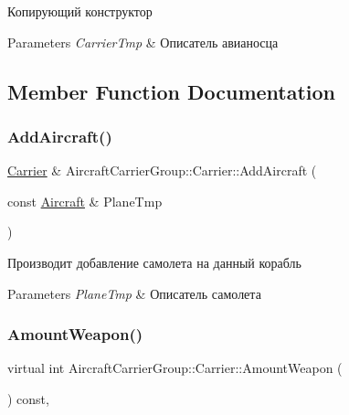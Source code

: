 Копирующий конструктор 


\begin{DoxyParams}{Parameters}
{\em Carrier\+Tmp} & Описатель авианосца \\
\hline
\end{DoxyParams}


\subsection{Member Function Documentation}
\mbox{\label{class_aircraft_carrier_group_1_1_carrier_ac85afb17582997d9e5956ff89d22a1e6}} 
\subsubsection{\texorpdfstring{Add\+Aircraft()}{AddAircraft()}}
{\footnotesize\ttfamily \mbox{\hyperlink{class_aircraft_carrier_group_1_1_carrier}{Carrier}} \& Aircraft\+Carrier\+Group\+::\+Carrier\+::\+Add\+Aircraft (\begin{DoxyParamCaption}\item[{const \mbox{\hyperlink{class_aircraft_carrier_group_1_1_aircraft}{Aircraft}} \&}]{Plane\+Tmp }\end{DoxyParamCaption})}



Производит добавление самолета на данный корабль 


\begin{DoxyParams}{Parameters}
{\em Plane\+Tmp} & Описатель самолета \\
\hline
\end{DoxyParams}
\mbox{\label{class_aircraft_carrier_group_1_1_carrier_af6d3cd1b93441f0cdee9c06a8e78bb05}} 
\subsubsection{\texorpdfstring{Amount\+Weapon()}{AmountWeapon()}}
{\footnotesize\ttfamily virtual int Aircraft\+Carrier\+Group\+::\+Carrier\+::\+Amount\+Weapon (\begin{DoxyParamCaption}{ }\end{DoxyParamCaption}) const\hspace{0.3cm}{\ttfamily [inline]}, {\ttfamily [virtual]}}



